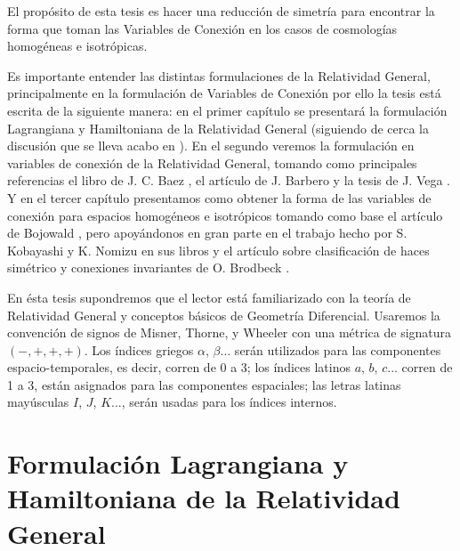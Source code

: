 \documentclass[11pt, letterpaper, spanish]{book}
\theoremstyle{definition}
\theoremstyle{plain}
\theoremstyle{remark}
\theoremstyle{break}
\begin{document}
El prop\'{o}sito de esta tesis es hacer una reducci\'{o}n de simetr\'{i}a para encontrar la forma que toman las Variables de Conexi\'{o}n en los casos de cosmolog\'{i}as homog\'{e}neas e isotr\'{o}picas.

Es importante entender las distintas formulaciones de la Relatividad General, principalmente en la formulaci\'{o}n de Variables de Conexi\'{o}n por ello la tesis est\'{a} escrita de la siguiente manera: en el primer cap\'{i}tulo se presentar\'{a} la formulaci\'{o}n Lagrangiana y Hamiltoniana de la Relatividad General (siguiendo de cerca la discusi\'{o}n que se lleva acabo en \cite{Poisson}). En el segundo veremos la formulaci\'{o}n en variables de conexi\'{o}n de la Relatividad General, tomando como principales referencias el libro de J. C. Baez \cite{Baez}, el art\'{i}culo de J. Barbero \cite{Barbero} y la tesis de J. Vega \cite{Vega}. Y en el tercer cap\'{i}tulo presentamos como obtener la forma de las variables de conexi\'{o}n para espacios homog\'{e}neos e isotr\'{o}picos tomando como base el art\'{i}culo de Bojowald \cite{Bojowald2005}, pero apoy\'{a}ndonos en gran parte en el trabajo hecho por S. Kobayashi y K. Nomizu en sus libros \cite{Kobayashi, Kobayashi2} y el art\'{i}culo sobre clasificaci\'{o}n de haces sim\'{e}trico y conexiones invariantes de O. Brodbeck \cite{Brodbeck}.

En \'{e}sta tesis supondremos que el lector est\'{a} familiarizado con la teor\'{i}a de Relatividad General y conceptos b\'{a}sicos de Geometr\'{i}a Diferencial. Usaremos la convenci\'{o}n de signos de Misner, Thorne, y Wheeler con una m\'{e}trica de signatura $(-,+,+,+)$. Los \'{i}ndices griegos $\alpha$, $\beta...$ ser\'{a}n utilizados para las componentes espacio-temporales, es decir, corren de 0 a 3; los \'{i}ndices latinos $a$, $b$, $c...$ corren de 1 a 3, est\'{a}n asignados para las componentes espaciales; las letras latinas may\'{u}sculas $I$, $J$, $K$..., ser\'{a}n usadas para los \'{i}ndices internos.


\chapter{Formulaci\'{o}n Lagrangiana y Hamiltoniana de la Relatividad General}
\label{chp:RG}


\end{document}
